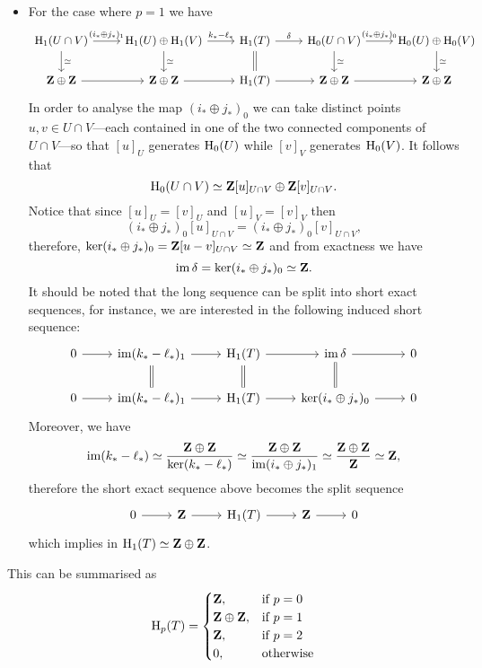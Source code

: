 \begin{example}[Torus]
\begin{enumerate}[(a)]
\begin{itemize}
  \item For the case where \(p = 1\) we have {\small
  \[
  \begin{tikzcd}
  \Hmlg_1(U \cap V) \ar[r, "{(i_{*} \oplus j_*)_1}"] \ar[d, "\dis"]
  &{\Hmlg_1(U) \oplus \Hmlg_1(V)} \ar[r, "{k_{*} - \ell_{*}}"] \ar[d, "\dis"]
  &\Hmlg_1(T) \ar[r, "\delta"] \ar[d, equals]
  &\Hmlg_0(U \cap V) \ar[r, "{(i_* \oplus j_{*})_0}"] \ar[d, "\dis"]
  &\Hmlg_0(U) \oplus \Hmlg_0(V) \ar[d, "\dis"]
  \\
  \Z \oplus \Z \ar[r]
  &\Z \oplus \Z \ar[r]
  &\Hmlg_1(T) \ar[r]
  &\Z \oplus \Z \ar[r]
  &\Z \oplus \Z
  \end{tikzcd}
  \]
  } In order to analyse the map \((i_* \oplus j_{*})_0\) we can take distinct points
  \(u, v \in U \cap V\)---each contained in one of the two connected components of
  \(U \cap V\)---so that \([u]_U\) generates \(\operatorname{H}_0(U)\) while \([v]_V\) generates
  \(\operatorname{H}_0(V)\). It follows that
  \[
  \operatorname{H}_0(U \cap V) \simeq \mathbf{Z} [u]_{U \cap V} \oplus \mathbf{Z} [v]_{U \cap V}.
  \]
  Notice that since \([u]_U = [v]_U\) and \([u]_V = [v]_V\) then
  \[
  (i_{*} \oplus j_{*})_0 [u]_{U \cap V} = (i_{*} \oplus j_{*})_0 [v]_{U \cap V},
  \]
  therefore, \(\ker(i_{*} \oplus j_{*})_0 = \mathbf{Z}[u - v]_{U \cap V} \simeq \mathbf{Z}\) and from
  exactness we have
  \[
  \operatorname{im} \delta = \ker(i_{*} \oplus j_{*})_0 \simeq \mathbf{Z}.
  \]
  It should be noted that the long sequence can be split into short exact
  sequences, for instance, we are interested in the following induced short
  sequence:
  \[
  \begin{tikzcd}
  0 \ar[r]
  &\im(k_{*} - \ell_{*})_1 \ar[r] \ar[d, equals]
  &\Hmlg_1(T) \ar[r] \ar[d, equals]
  &\im \delta \ar[d, equals] \ar[r]
  &0
  \\
  0 \ar[r]
  &\im(k_{*} - \ell_{*})_1 \ar[r]
  &\Hmlg_1(T) \ar[r]
  &\ker(i_{*} \oplus j_{*})_0
  \ar[r]
  &0
  \end{tikzcd}
  \]
  Moreover, we have
  \[
  \operatorname{im} (k_{*} - \ell_{*}) \simeq \frac{\mathbf{Z} \oplus \mathbf{Z}}{\ker (k_{*} - \ell_{*})}
  \simeq \frac{\mathbf{Z} \oplus \mathbf{Z}}{\operatorname{im}(i_{*} \oplus j_{*})_1}
  \simeq \frac{\mathbf{Z} \oplus \mathbf{Z}}{\mathbf{Z}}
  \simeq \mathbf{Z},
  \]
  therefore the short exact sequence above becomes the split sequence
  \[
  \begin{tikzcd}
  0 \ar[r] &\Z \ar[r] &\Hmlg_1(T) \ar[r] &\Z \ar[r] &0
  \end{tikzcd}
  \]
  which implies in \(\operatorname{H}_1(T) \simeq \mathbf{Z} \oplus \mathbf{Z}\).
  \end{itemize}
  This can be summarised as
  \[
  \operatorname{H}_p(T) =
  \begin{cases}
    \mathbf{Z}, &\text{if } p = 0 \\
    \mathbf{Z} \oplus \mathbf{Z}, &\text{if } p = 1 \\
    \mathbf{Z}, &\text{if } p = 2 \\
    0, &\text{otherwise}
  \end{cases}
  \]


\end{enumerate}
\end{example}
